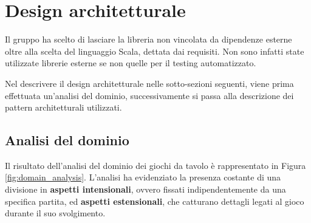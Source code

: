 \section{Design architetturale}




Il gruppo ha scelto di lasciare la libreria non vincolata da dipendenze esterne oltre alla scelta del linguaggio Scala, dettata dai requisiti.
%
Non sono infatti state utilizzate librerie esterne se non quelle per il testing automatizzato.

Nel descrivere il design architetturale nelle sotto-sezioni seguenti, viene prima effettuata un'analisi del dominio, successivamente si passa alla descrizione dei pattern architetturali utilizzati.

\subsection{Analisi del dominio}

Il risultato dell'analisi del dominio dei giochi da tavolo è rappresentato in Figura \ref{fig:domain_analysis}.
%
L'analisi ha evidenziato la presenza costante di una divisione in \textbf{aspetti intensionali}, ovvero fissati indipendentemente da una specifica partita, ed \textbf{aspetti estensionali}, che catturano dettagli legati al gioco durante il suo svolgimento.

